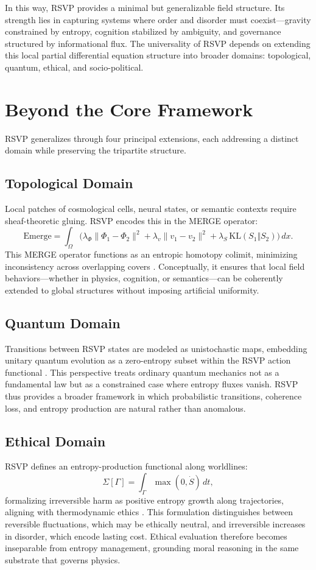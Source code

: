 \documentclass[12pt]{article}
\begin{document}
In this way, RSVP provides a minimal but generalizable field structure. Its strength lies in capturing systems where order and disorder must coexist—gravity constrained by entropy, cognition stabilized by ambiguity, and governance structured by informational flux. The universality of RSVP depends on extending this local partial differential equation structure into broader domains: topological, quantum, ethical, and socio-political.

\section{Beyond the Core Framework}
RSVP generalizes through four principal extensions, each addressing a distinct domain while preserving the tripartite structure.

\subsection{Topological Domain}
Local patches of cosmological cells, neural states, or semantic contexts require sheaf-theoretic gluing. RSVP encodes this in the MERGE operator:
\[
\mathrm{Emerge} = \int_\Omega \Big(\lambda_\Phi\|\Phi_1-\Phi_2\|^2 + \lambda_v\|v_1-v_2\|^2 + \lambda_S\,\mathrm{KL}(S_1\Vert S_2)\Big)\,dx.
\]
This MERGE operator functions as an entropic homotopy colimit, minimizing inconsistency across overlapping covers \citep{lurie2009higher}. Conceptually, it ensures that local field behaviors—whether in physics, cognition, or semantics—can be coherently extended to global structures without imposing artificial uniformity.

\subsection{Quantum Domain}
Transitions between RSVP states are modeled as unistochastic maps, embedding unitary quantum evolution as a zero-entropy subset within the RSVP action functional \citep{barandes2022unistochastic}. This perspective treats ordinary quantum mechanics not as a fundamental law but as a constrained case where entropy fluxes vanish. RSVP thus provides a broader framework in which probabilistic transitions, coherence loss, and entropy production are natural rather than anomalous.

\subsection{Ethical Domain}
RSVP defines an entropy-production functional along worldlines:
\[
\Sigma[\Gamma] = \int_\Gamma \max(0,\dot S)\,dt,
\]
formalizing irreversible harm as positive entropy growth along trajectories, aligning with thermodynamic ethics \citep{verlinde2011entropic}. This formulation distinguishes between reversible fluctuations, which may be ethically neutral, and irreversible increases in disorder, which encode lasting cost. Ethical evaluation therefore becomes inseparable from entropy management, grounding moral reasoning in the same substrate that governs physics.
\end{document}

